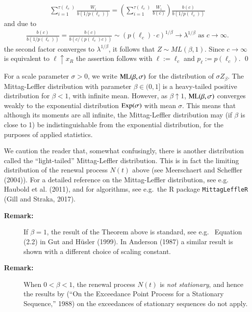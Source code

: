 \documentclass[]{elsarticle} %
\begin{document}
\begin{align*}
    \sum_{i=1}^{ \tau(\ell_c)} \frac{W_i}{b(1/p(\ell_c))} = \left(\sum_{i=1}^{ \tau(\ell_c)} \frac{W_i}{b(c) }\right) \frac{b(c)}{b(1/p(\ell_c))}  
    \end{align*} and due to \begin{align*}
    \frac{b(c)}{b(1/p(\ell_c))} = \frac{b(c)}{b(c/(p(\ell_c)c))} \sim (p(\ell_c) \cdot c)^{1/\beta} \rightarrow \lambda^{1/\beta} \text{ as } c \rightarrow \infty.
    \end{align*} the second factor converges to \(\lambda^{1/\beta}\),
it follows that \(Z \sim ML(\beta,1)\). Since \(c \rightarrow \infty\)
is equivalent to \(\ell \uparrow x_R\) the assertion follows with
\(\ell:=\ell_c\) and \(p_\ell:=p(\ell_c)\). \qed

For a scale parameter \(\sigma > 0\), we write
\({\rm ML}(\beta, \sigma)\) for the distribution of \(\sigma Z_\beta\).
The Mittag-Leffler distribution with parameter \(\beta \in (0,1]\) is a
heavy-tailed positive distribution for \(\beta < 1\), with infinite
mean. However, as \(\beta \uparrow 1\), \({\rm ML}(\beta, \sigma)\)
converges weakly to the exponential distribution \({\rm Exp}(\sigma)\)
with mean \(\sigma\). This means that although its moments are all
infinite, the Mittag-Leffler distribution may (if \(\beta\) is close to
1) be indistinguishable from the exponential distribution, for the
purposes of applied statistics.

We caution the reader that, somewhat confusingly, there is another
distribution called the ``light-tailed'' Mittag-Leffler distribution.
This is in fact the limiting distribution of the renewal process
\(N(t)\) above (see Meerschaert and Scheffler (2004)). For a detailed
reference on the Mittag-Leffler distribution, see e.g.~ Haubold et al.
(2011), and for algorithms, see e.g.~the R package
\texttt{MittagLeffleR} (Gill and Straka, 2017).

\begin{description}
\item[\textbf{Remark:}]
If \(\beta = 1\), the result of the Theorem above is standard, see e.g.~
Equation (2.2) in Gut and Hüsler (1999). In Anderson (1987) a similar
result is shown with a different choice of scaling constant.
\item[\textbf{Remark:}]
When \(0 < \beta < 1\), the renewal process \(N(t)\) is \emph{not
stationary}, and hence the results by (``On the Exceedance Point Process
for a Stationary Sequence,'' 1988) on the exceedances of stationary
sequences do not apply.
\end{description}
\end{document}
